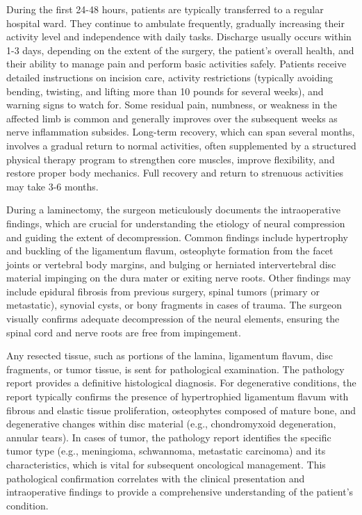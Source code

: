 During the first 24-48 hours, patients are typically transferred to a regular hospital ward. They continue to ambulate frequently, gradually increasing their activity level and independence with daily tasks. Discharge usually occurs within 1-3 days, depending on the extent of the surgery, the patient's overall health, and their ability to manage pain and perform basic activities safely. Patients receive detailed instructions on incision care, activity restrictions (typically avoiding bending, twisting, and lifting more than 10 pounds for several weeks), and warning signs to watch for. Some residual pain, numbness, or weakness in the affected limb is common and generally improves over the subsequent weeks as nerve inflammation subsides. Long-term recovery, which can span several months, involves a gradual return to normal activities, often supplemented by a structured physical therapy program to strengthen core muscles, improve flexibility, and restore proper body mechanics. Full recovery and return to strenuous activities may take 3-6 months.

During a laminectomy, the surgeon meticulously documents the intraoperative findings, which are crucial for understanding the etiology of neural compression and guiding the extent of decompression. Common findings include hypertrophy and buckling of the ligamentum flavum, osteophyte formation from the facet joints or vertebral body margins, and bulging or herniated intervertebral disc material impinging on the dura mater or exiting nerve roots. Other findings may include epidural fibrosis from previous surgery, spinal tumors (primary or metastatic), synovial cysts, or bony fragments in cases of trauma. The surgeon visually confirms adequate decompression of the neural elements, ensuring the spinal cord and nerve roots are free from impingement.

Any resected tissue, such as portions of the lamina, ligamentum flavum, disc fragments, or tumor tissue, is sent for pathological examination. The pathology report provides a definitive histological diagnosis. For degenerative conditions, the report typically confirms the presence of hypertrophied ligamentum flavum with fibrous and elastic tissue proliferation, osteophytes composed of mature bone, and degenerative changes within disc material (e.g., chondromyxoid degeneration, annular tears). In cases of tumor, the pathology report identifies the specific tumor type (e.g., meningioma, schwannoma, metastatic carcinoma) and its characteristics, which is vital for subsequent oncological management. This pathological confirmation correlates with the clinical presentation and intraoperative findings to provide a comprehensive understanding of the patient's condition.

